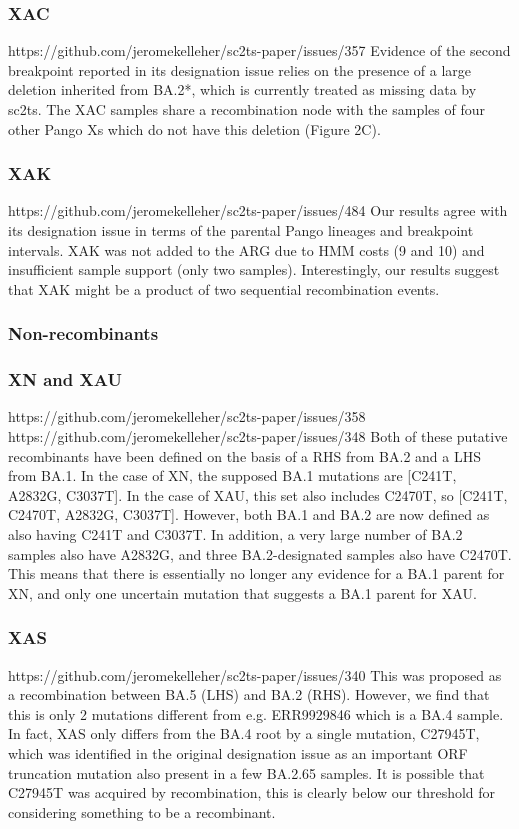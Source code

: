\documentclass[12pt,letterpaper]{article}
\begin{document}
\subsubsection*{XAC}
https://github.com/jeromekelleher/sc2ts-paper/issues/357
Evidence of the second breakpoint reported in its designation issue relies on 
the presence of a large deletion inherited from BA.2*, which is currently treated as missing data by sc2ts. 
The XAC samples share a recombination node with the samples of four other Pango Xs 
which do not have this deletion (Figure 2C).

\subsubsection*{XAK}
https://github.com/jeromekelleher/sc2ts-paper/issues/484
Our results agree with its designation issue in terms of the parental Pango lineages and breakpoint intervals. 
XAK was not added to the ARG due to HMM costs (9 and 10) and insufficient sample support (only two samples). 
Interestingly, our results suggest that XAK might be a product of two sequential recombination events.

\subsubsection*{Non-recombinants}
\subsubsection*{XN and XAU}
https://github.com/jeromekelleher/sc2ts-paper/issues/358
https://github.com/jeromekelleher/sc2ts-paper/issues/348
Both of these putative recombinants have been defined on the basis of a RHS from BA.2 and a LHS from BA.1. 
In the case of XN, the supposed BA.1 mutations are [C241T, A2832G, C3037T]. 
In the case of XAU, this set also includes C2470T, so [C241T, C2470T, A2832G, C3037T]. 
However, both BA.1 and BA.2 are now defined as also having C241T and C3037T. 
In addition, a very large number of BA.2 samples also have A2832G, and three BA.2-designated samples also have C2470T. 
This means that there is essentially no longer any evidence for a BA.1 parent for XN, and 
only one uncertain mutation that suggests a BA.1 parent for XAU.

\subsubsection*{XAS}
https://github.com/jeromekelleher/sc2ts-paper/issues/340
This was proposed as a recombination between BA.5 (LHS) and BA.2 (RHS). 
However, we find that this is only 2 mutations different from e.g. ERR9929846 which is a BA.4 sample. 
In fact, XAS only differs from the BA.4 root by a single mutation, C27945T, 
which was identified in the original designation issue as an important ORF truncation mutation also present in a few BA.2.65 samples. 
It is possible that C27945T was acquired by recombination, this is clearly below our threshold for considering something to be a recombinant.
\end{document}
